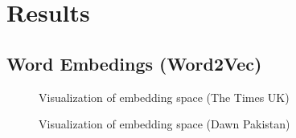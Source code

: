 \documentclass{article}
\begin{document}
\newpage


\section{Results}{	
\subsection{Word Embedings (Word2Vec)}{

\begin{figure}[H]
	\caption{\label{fig:my-label1} Visualization of embedding space (The Times UK)}
\end{figure}

\begin{figure}[H]
	\caption{\label{fig:my-label1} Visualization of embedding space (Dawn Pakistan)}
\end{figure}

}}
\end{document}
